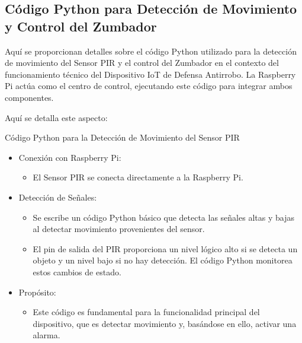 \documentclass{report}
\begin{document}
\subsection{Código Python para Detección de Movimiento y Control del Zumbador}
Aquí se  proporcionan detalles sobre el código Python utilizado para la detección de movimiento del Sensor PIR y el 
control del Zumbador en el contexto del funcionamiento técnico del Dispositivo IoT de Defensa Antirrobo. La Raspberry Pi actúa como 
el centro de control, ejecutando este código para integrar ambos componentes.

Aquí se detalla este aspecto:

Código Python para la Detección de Movimiento del Sensor PIR
\begin{itemize}
    \item Conexión con Raspberry Pi:
    \begin{itemize}
        \item El Sensor PIR se conecta directamente a la Raspberry Pi.
    \end{itemize}
    
    \item Detección de Señales:
    \begin{itemize}
        \item Se escribe un código Python básico que detecta las señales altas y bajas al detectar movimiento provenientes del sensor.
        \item El pin de salida del PIR proporciona un nivel lógico alto si se detecta un objeto y un nivel bajo si no hay detección. El código 
        Python monitorea estos cambios de estado.
    \end{itemize}
    
    \item Propósito:
    \begin{itemize}
        \item Este código es fundamental para la funcionalidad principal del dispositivo, que es detectar movimiento 
        y, basándose en ello, activar una alarma.
    \end{itemize}
\end{itemize}
\end{document}
